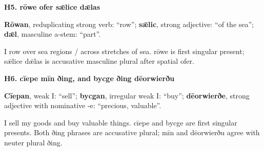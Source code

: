 \par\begin{minipage}{\linewidth}\raggedright
\textbf{H5. rōwe ofer sǣlice dǣlas}

\textbf{Rōwan}, reduplicating strong verb: “row”; \textbf{sǣlic}, strong adjective: “of the sea”; \textbf{dǣl}, masculine a-stem: “part”.

I row over sea regions /\allowbreak{} across stretches of sea. rōwe is first singular present; sǣlice dǣlas is accusative masculine plural after spatial ofer.

\end{minipage}\par\addvspace{4pt}

\par\begin{minipage}{\linewidth}\raggedright
\textbf{H6. cīepe mīn ðing, and bycge ðing dēorwierðu}

\textbf{Cīepan}, weak I: “sell”; \textbf{bycgan}, irregular weak I: “buy”; \textbf{dēorwierðe}, strong adjective with nominative -e: “precious, valuable”.

I sell my goods and buy valuable things. cīepe and bycge are first singular presents. Both ðing phrases are accusative plural; mīn and dēorwierðu agree with neuter plural ðing.

\end{minipage}\par\addvspace{4pt}

